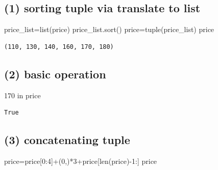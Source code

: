 \documentclass[
  a4paper,
  DIV=11,
  numbers=noendperiod]{scrreprt}
\newenvironment{Shaded}{\begin{snugshade}}{\end{snugshade}}
\newcommand{\BuiltInTok}[1]{\textcolor[rgb]{0.00,0.23,0.31}{#1}}
\newcommand{\DecValTok}[1]{\textcolor[rgb]{0.68,0.00,0.00}{#1}}
\newcommand{\KeywordTok}[1]{\textcolor[rgb]{0.00,0.23,0.31}{#1}}
\newcommand{\NormalTok}[1]{\textcolor[rgb]{0.00,0.23,0.31}{#1}}
\newcommand{\OperatorTok}[1]{\textcolor[rgb]{0.37,0.37,0.37}{#1}}
\begin{document}
\subsection*{(1) sorting tuple via translate to
list}\label{sorting-tuple-via-translate-to-list}

\begin{Shaded}
\begin{Highlighting}[]
\NormalTok{price\_list}\OperatorTok{=}\BuiltInTok{list}\NormalTok{(price)}
\NormalTok{price\_list.sort()}
\NormalTok{price}\OperatorTok{=}\BuiltInTok{tuple}\NormalTok{(price\_list)}
\NormalTok{price}
\end{Highlighting}
\end{Shaded}

\begin{verbatim}
(110, 130, 140, 160, 170, 180)
\end{verbatim}

\subsection*{(2) basic operation}\label{basic-operation}

\begin{Shaded}
\begin{Highlighting}[]
\DecValTok{170} \KeywordTok{in}\NormalTok{ price}
\end{Highlighting}
\end{Shaded}

\begin{verbatim}
True
\end{verbatim}

\subsection*{(3) concatenating tuple}\label{concatenating-tuple}

\begin{Shaded}
\begin{Highlighting}[]
\NormalTok{price}\OperatorTok{=}\NormalTok{price[}\DecValTok{0}\NormalTok{:}\DecValTok{4}\NormalTok{]}\OperatorTok{+}\NormalTok{(}\DecValTok{0}\NormalTok{,)}\OperatorTok{*}\DecValTok{3}\OperatorTok{+}\NormalTok{price[}\BuiltInTok{len}\NormalTok{(price)}\OperatorTok{{-}}\DecValTok{1}\NormalTok{:]}
\NormalTok{price}
\end{Highlighting}
\end{Shaded}
\end{document}
